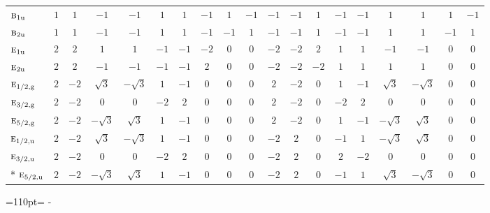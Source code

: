 \documentclass[10pt,a4paper]{article}
\makeatletter
\def\grouprule#1#2{\noalign{\marks\LTgroupmarks{\the\belowrulesep}\nobreak\vskip#1%
  \vskip\aboverulesep}\multispan\LT@cols\unskip{\leaders\hrule\@height#2\hfill\kern\z@}\cr
  \noalign{\penalty\LTrulebreak\vskip\belowrulesep\global\@lastruleclass\z@}}
\newcommand{\needspace}[1]{\par\penalty-100\begingroup\dimen0=#1\relax\dimen2=\pagegoal
  \advance\dimen2-\pagetotal\ifdim\dimen0>\dimen2\relax\ifdim\dimen2>0pt\vfil\break\fi\fi
  \endgroup}
\numberwithin{equation}{section}
\newcommand{\irr}[1]{\text{\normalfont\scshape #1}}
\newcommand{\ptag}[1]{\mathrm{#1}}
\makeatother
\begin{document}
{\begin{longtable}{@{}lcccccccccccccccccc@{}}
$\irr{b}_{1\ptag{u}}$ & $1$ & $1$ & $-1$ & $-1$ & $1$ & $1$ & $-1$ & $1$ & $-1$ & $-1$ & $-1$ & $1$ & $-1$ & $-1$ & $1$ & $1$ & $1$ & $-1$\\
$\irr{b}_{2\ptag{u}}$ & $1$ & $1$ & $-1$ & $-1$ & $1$ & $1$ & $-1$ & $-1$ & $1$ & $-1$ & $-1$ & $1$ & $-1$ & $-1$ & $1$ & $1$ & $-1$ & $1$\\
$\irr{e}_{1\ptag{u}}$ & $2$ & $2$ & $1$ & $1$ & $-1$ & $-1$ & $-2$ & $0$ & $0$ & $-2$ & $-2$ & $2$ & $1$ & $1$ & $-1$ & $-1$ & $0$ & $0$\\
$\irr{e}_{2\ptag{u}}$ & $2$ & $2$ & $-1$ & $-1$ & $-1$ & $-1$ & $2$ & $0$ & $0$ & $-2$ & $-2$ & $-2$ & $1$ & $1$ & $1$ & $1$ & $0$ & $0$\\
\grouprule{0pt}{\lightrulewidth}
$\irr{e}_{1/2,\ptag{g}}$ & $2$ & $-2$ & $\sqrt{3}$ & $-\sqrt{3}$ & $1$ & $-1$ & $0$ & $0$ & $0$ & $2$ & $-2$ & $0$ & $1$ & $-1$ & $\sqrt{3}$ & $-\sqrt{3}$ & $0$ & $0$\\
$\irr{e}_{3/2,\ptag{g}}$ & $2$ & $-2$ & $0$ & $0$ & $-2$ & $2$ & $0$ & $0$ & $0$ & $2$ & $-2$ & $0$ & $-2$ & $2$ & $0$ & $0$ & $0$ & $0$\\
$\irr{e}_{5/2,\ptag{g}}$ & $2$ & $-2$ & $-\sqrt{3}$ & $\sqrt{3}$ & $1$ & $-1$ & $0$ & $0$ & $0$ & $2$ & $-2$ & $0$ & $1$ & $-1$ & $-\sqrt{3}$ & $\sqrt{3}$ & $0$ & $0$\\
$\irr{e}_{1/2,\ptag{u}}$ & $2$ & $-2$ & $\sqrt{3}$ & $-\sqrt{3}$ & $1$ & $-1$ & $0$ & $0$ & $0$ & $-2$ & $2$ & $0$ & $-1$ & $1$ & $-\sqrt{3}$ & $\sqrt{3}$ & $0$ & $0$\\
$\irr{e}_{3/2,\ptag{u}}$ & $2$ & $-2$ & $0$ & $0$ & $-2$ & $2$ & $0$ & $0$ & $0$ & $-2$ & $2$ & $0$ & $2$ & $-2$ & $0$ & $0$ & $0$ & $0$\\*
$\irr{e}_{5/2,\ptag{u}}$ & $2$ & $-2$ & $-\sqrt{3}$ & $\sqrt{3}$ & $1$ & $-1$ & $0$ & $0$ & $0$ & $-2$ & $2$ & $0$ & $-1$ & $1$ & $\sqrt{3}$ & $-\sqrt{3}$ & $0$ & $0$\\
\bottomrule\end{longtable}}
\needspace{110pt}
\end{document}
